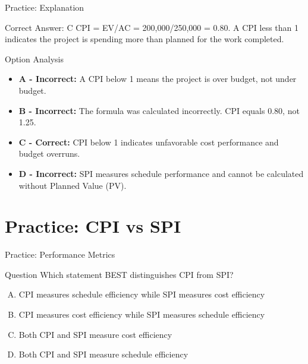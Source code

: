 \documentclass{beamer}
\begin{document}
	\begin{frame}{Practice: Explanation}
		\begin{block}{Correct Answer: C}
			CPI = EV/AC = 200,000/250,000 = 0.80. A CPI less than 1 indicates the project is spending more than planned for the work completed.
		\end{block}
		\begin{block}{Option Analysis}
			\begin{itemize}
				\item \textbf{A - Incorrect:} A CPI below 1 means the project is over budget, not under budget.
				\item \textbf{B - Incorrect:} The formula was calculated incorrectly. CPI equals 0.80, not 1.25.
				\item \textbf{C - Correct:} CPI below 1 indicates unfavorable cost performance and budget overruns.
				\item \textbf{D - Incorrect:} SPI measures schedule performance and cannot be calculated without Planned Value (PV).
			\end{itemize}
		\end{block}
	\end{frame}
	
	\section{Practice: CPI vs SPI}
	
	\begin{frame}{Practice: Performance Metrics}
		\begin{block}{Question}
			Which statement BEST distinguishes CPI from SPI?
		\end{block}
		\begin{enumerate}[(A)]
			\item CPI measures schedule efficiency while SPI measures cost efficiency
			\item CPI measures cost efficiency while SPI measures schedule efficiency
			\item Both CPI and SPI measure cost efficiency
			\item Both CPI and SPI measure schedule efficiency
		\end{enumerate}
	\end{frame}
	
\end{document}
